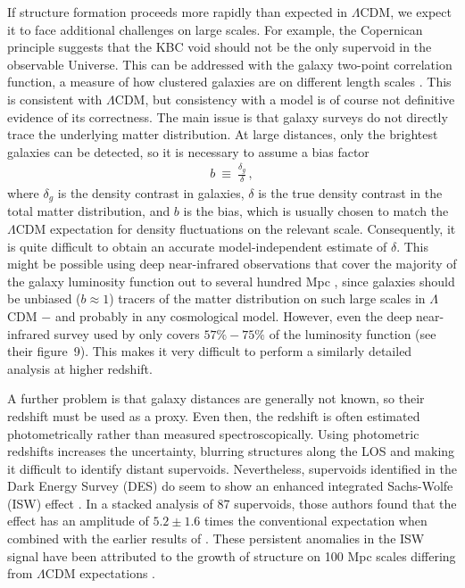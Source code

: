 \documentclass[fleqn,usenatbib,useAMS,onecolumn]{mnras} %
\begin{document}
If structure formation proceeds more rapidly than expected in $\Lambda$CDM, we expect it to face additional challenges on large scales. For example, the Copernican principle suggests that the KBC void should not be the only supervoid in the observable Universe. This can be addressed with the galaxy two-point correlation function, a measure of how clustered galaxies are on different length scales \citep{Anderson_2012}. This is consistent with $\Lambda$CDM, but consistency with a model is of course not definitive evidence of its correctness. The main issue is that galaxy surveys do not directly trace the underlying matter distribution. At large distances, only the brightest galaxies can be detected, so it is necessary to assume a bias factor
\begin{eqnarray}
	b ~\equiv~ \frac{\delta_g}{\delta} \, ,
	\label{Bias_factor}
\end{eqnarray}
where $\delta_g$ is the density contrast in galaxies, $\delta$ is the true density contrast in the total matter distribution, and $b$ is the bias, which is usually chosen to match the $\Lambda$CDM expectation for density fluctuations on the relevant scale. Consequently, it is quite difficult to obtain an accurate model-independent estimate of $\delta$. This might be possible using deep near-infrared observations that cover the majority of the galaxy luminosity function out to several hundred Mpc \citep[as done by][]{Keenan_2013}, since galaxies should be unbiased ($b \approx 1$) tracers of the matter distribution on such large scales in $\Lambda$CDM \citep{Peebles_2001} $-$ and probably in any cosmological model. However, even the deep near-infrared survey used by \citet{Keenan_2013} only covers $57\%-75\%$ of the luminosity function (see their figure~9). This makes it very difficult to perform a similarly detailed analysis at higher redshift.

A further problem is that galaxy distances are generally not known, so their redshift must be used as a proxy. Even then, the redshift is often estimated photometrically rather than measured spectroscopically. Using photometric redshifts increases the uncertainty, blurring structures along the LOS and making it difficult to identify distant supervoids. Nevertheless, supervoids identified in the Dark Energy Survey (DES) do seem to show an enhanced integrated Sachs-Wolfe (ISW) effect \citep{Kovacs_2019}. In a stacked analysis of 87 supervoids, those authors found that the effect has an amplitude of ${5.2 \pm 1.6}$ times the conventional expectation when combined with the earlier results of \citet{Kovacs_2018}. These persistent anomalies in the ISW signal have been attributed to the growth of structure on 100 Mpc scales differing from $\Lambda$CDM expectations \citep{Kovacs_2022_ISW}.
\end{document}
